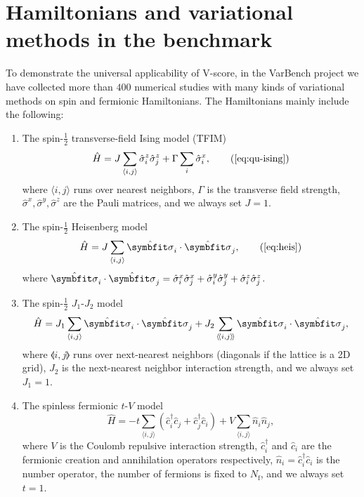 \section{Hamiltonians and variational methods in the benchmark}

To demonstrate the universal applicability of V-score, in the VarBench project we have collected more than $400$ numerical studies with many kinds of variational methods on spin and fermionic Hamiltonians. The Hamiltonians mainly include the following:
\begin{enumerate}
\setlength{\itemsep}{0ex}
\item The spin-$\frac{1}{2}$ transverse-field Ising model (TFIM)
\begin{equation}
\hat{H} = J \sum_{\langle i, j \rangle} \hat{\sigma}^z_i \hat{\sigma}^z_j
+ \Gamma \sum_i \hat{\sigma}^x_i,
\tag{\ref{eq:qu-ising}}
\end{equation}
where $\langle i, j \rangle$ runs over nearest neighbors, $\Gamma$ is the transverse field strength, $\hat{\sigma}^x, \hat{\sigma}^y, \hat{\sigma}^z$ are the Pauli matrices, and we always set $J = 1$.

\item The spin-$\frac{1}{2}$ Heisenberg model
\begin{equation}
\hat{H} = J \sum_{\langle i, j \rangle} \hat{\vsi}_i \cdot \hat{\vsi}_j,
\tag{\ref{eq:heis}}
\end{equation}
where $\hat{\vsi}_i \cdot \hat{\vsi}_j = \hat{\sigma}^x_i \hat{\sigma}^x_j + \hat{\sigma}^y_i \hat{\sigma}^y_j + \hat{\sigma}^z_i \hat{\sigma}^z_j$.

\item The spin-$\frac{1}{2}$ $J_1$-$J_2$ model
\begin{equation}
\hat{H} = J_1 \sum_{\langle i, j \rangle} \hat{\vsi}_i \cdot \hat{\vsi}_j
+ J_2 \sum_{\llangle i, j \rrangle} \hat{\vsi}_i \cdot \hat{\vsi}_j,
\end{equation}
where $\llangle i, j \rrangle$ runs over next-nearest neighbors (diagonals if the lattice is a 2D grid), $J_2$ is the next-nearest neighbor interaction strength, and we always set $J_1 = 1$.

\item The spinless fermionic $t$-$V$ model
\begin{equation}
\hat{H} = -t \sum_{\langle i, j \rangle} \left( \hat{c}^\dagger_i \hat{c}_j + \hat{c}^\dagger_j \hat{c}_i \right)
+ V \sum_{\langle i, j \rangle} \hat{n}_i \hat{n}_j,
\end{equation}
where $V$ is the Coulomb repulsive interaction strength, $\hat{c}^\dagger_i$ and $\hat{c}_i$ are the fermionic creation and annihilation operators respectively, $\hat{n}_i = \hat{c}^\dagger_i \hat{c}_i$ is the number operator, the number of fermions is fixed to $N_\text{f}$, and we always set $t = 1$.


\end{enumerate}
